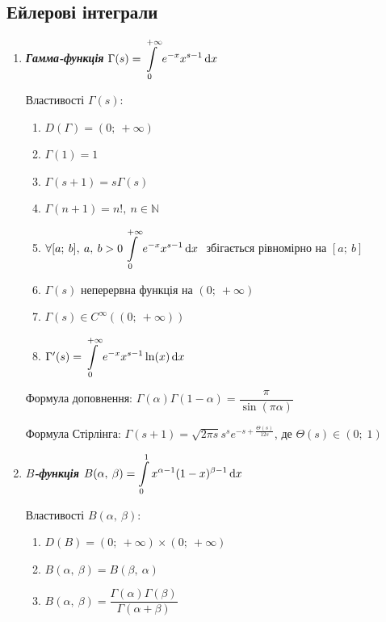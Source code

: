 \subsection{\large{Ейлерові інтеграли}}
       \begin{enumerate}
           \item \textcolor{NavyBlue}{\textbf{\textit{Гамма-функція}}}
           $\Gamma (s) = \displaystyle\int\limits_0^{+\infty}  e^{-x} x^{s-1} \, \mathrm{d}x$
           
           Властивості  $\Gamma (s) $:
          \begin{enumerate}
           \item    $D(\Gamma) = (0; \: +\infty)$
          \item $\Gamma (1) = 1 $
          \item $\Gamma (s+1) = s  \Gamma (s)$
          \item $\Gamma (n+1) = n!, \ n \in \mathbb{N}$
          \item $\forall[a; \: b], \: a, \: b > 0 \displaystyle\int\limits_0^{+\infty} e^{-x} x^{s-1} \, \mathrm{d}x \ $    збігається рівномірно на $[a; \: b]$
          \item  $\Gamma (s)$ неперервна функція на  $(0; \: +\infty)$
          \item  $\Gamma (s)  \in C^{\infty}((0; \: +\infty))$
          \item  $\Gamma '  (s) = \displaystyle\int\limits_0^{+\infty} e^{-x} x^{s-1} \ln(x) \, \mathrm{d}x$
    
       \end{enumerate}
       
       
       Формула доповнення: $\Gamma(\alpha)  \Gamma (1-\alpha) = \dfrac{\pi}{\sin({\pi \alpha})}$
       
       
       
       
       Формула Стірлінга: \(\Gamma(s+1) = \sqrt{2\pi s}  s^{s}   e^{\displaystyle- s+ \displaystyle \frac{\Theta(s)}{12s}}\), \: де $\Theta(s) \in (0; \; 1)$
           \item \textcolor{NavyBlue}{\textbf{\textit{$B$-функція}}} $B(\alpha, \: \beta) = \displaystyle\int\limits_0^1 x^{\alpha-1} (1-x)^{\beta-1} \, \mathrm{d}x $
           
            Властивості  $B(\alpha, \: \beta) $:
          \begin{enumerate}
          \item    $D(B) = (0; \: +\infty) \times (0; \:+\infty)$ 
         \item $B(\alpha, \: \beta) = B(\beta, \: \alpha)$
          \item $B(\alpha, \: \beta) = \dfrac{\Gamma(\alpha)
\Gamma(\beta)}{\Gamma(\alpha+\beta)}$
        \end{enumerate}
       \end{enumerate}

